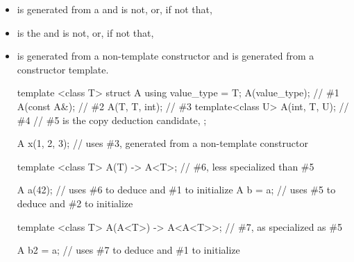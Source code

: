 \begin{itemize}
\item
{} is generated from a
and  is not, or, if not that,

\item
{} is the 
and  is not, or, if not that,

\item
{} is generated from a non-template constructor
and  is generated from a constructor template.
\begin{example}
\begin{codeblock}
template <class T> struct A {
  using value_type = T;
  A(value_type);    // \#1
  A(const A&);      // \#2
  A(T, T, int);     // \#3
  template<class U>
    A(int, T, U);   // \#4
  // \#5 is the copy deduction candidate, 
};

A x(1, 2, 3);       // uses \#3, generated from a non-template constructor

template <class T>
A(T) -> A<T>;       // \#6, less specialized than \#5

A a(42);            // uses \#6 to deduce  and \#1 to initialize
A b = a;            // uses \#5 to deduce  and \#2 to initialize

template <class T>
A(A<T>) -> A<A<T>>; // \#7, as specialized as \#5

A b2 = a;           // uses \#7 to deduce  and \#1 to initialize
\end{codeblock}
\end{example}
\end{itemize}

